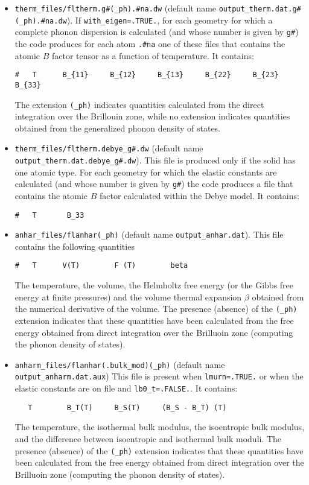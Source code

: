 \documentclass[12pt,a4paper]{article}
\begin{document}
\begin{itemize}
\item 
\texttt{therm\_files/fltherm.g\#(\_ph).\#na.dw} (default name 
\texttt{output\_therm.dat.g\#(\_ph).\#na.dw}). 
If \texttt{with\_eigen=.TRUE.}, for each geometry for which 
a complete phonon dispersion is calculated (and whose number is given
by \texttt{g\#}) the code produces for each atom \texttt{.\#na} one of these 
files that contains the atomic $B$ factor tensor as a function of 
temperature. It contains:
\begin{verbatim}
#   T      B_{11}     B_{12}     B_{13}     B_{22}     B_{23}     B_{33}
\end{verbatim}
The extension \texttt{(\_ph)} indicates 
quantities calculated from the direct integration over the Brillouin zone,
while no extension indicates quantities obtained from the generalized phonon 
density of states.

\item 
\texttt{therm\_files/fltherm.debye\_g\#.dw} (default name 
\texttt{output\_therm.dat.debye\_g\#.dw}). This file is produced
only if the solid has one atomic type. For each geometry for which 
the elastic constants are calculated (and whose number is given
by \texttt{g\#}) the code produces a file that contains 
the atomic $B$ factor calculated within the Debye model. It contains:
\begin{verbatim}
#   T       B_33 
\end{verbatim}

\item 
\texttt{anhar\_files/flanhar(\_ph)} (default name \texttt{output\_anhar.dat}).
This file contains the following quantities
\begin{verbatim}
#   T      V(T)        F (T)        beta 
\end{verbatim}
The temperature, the volume, the Helmholtz free energy (or the Gibbs free
energy at finite pressures) and the volume
thermal expansion $\beta$ obtained from the numerical derivative of the
volume. 
The presence (absence) of the \texttt{(\_ph)} extension indicates that
these quantities have been calculated from the free energy obtained from 
direct integration over the Brilluoin zone (computing the phonon density
of states). 

\item \texttt{anharm\_files/flanhar(.bulk\_mod)(\_ph)} 
(default name \texttt{output\_anharm.dat.aux})
This file is present when \texttt{lmurn=.TRUE.} or when the elastic
constants are on file and \texttt{lb0\_t=.FALSE.}. It contains:
\begin{verbatim}
   T        B_T(T)     B_S(T)     (B_S - B_T) (T) 
\end{verbatim}
The temperature, the isothermal bulk modulus, the isoentropic bulk modulus,
and the difference between isoentropic and isothermal bulk moduli.
The presence (absence) of the \texttt{(\_ph)} extension indicates that
these quantities have been calculated from the free energy obtained from 
direct integration over the Brilluoin zone (computing the phonon density
of states). 


\end{itemize}
\end{document}
